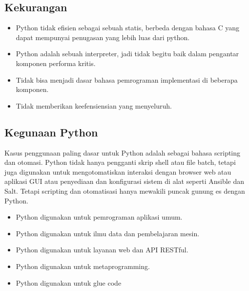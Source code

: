 	\subsection{Kekurangan}
		\begin{itemize}
			\item Python tidak efisien sebagai sebuah statis, berbeda dengan bahasa C yang dapat mempunyai penugasan yang lebih luas dari python.
			\item Python adalah sebuah interpreter, jadi tidak begitu baik dalam pengantar komponen performa kritis.
			\item Tidak bisa menjadi dasar bahasa pemrograman implementasi di beberapa komponen.
			\item Tidak memberikan keefensiensian yang menyeluruh.
		\end{itemize}
	
	\subsection{Kegunaan Python}		
	Kasus penggunaan paling dasar untuk Python adalah sebagai bahasa scripting dan otomasi. Python tidak hanya pengganti skrip shell atau file batch, 
	tetapi juga digunakan untuk mengotomatiskan interaksi dengan browser web atau aplikasi GUI atau penyediaan dan konfigurasi sistem di alat seperti 
	Ansible dan Salt. Tetapi scripting dan otomatisasi hanya mewakili puncak gunung es dengan Python.
		\begin{itemize}
			\item Python digunakan untuk pemrograman aplikasi umum.
			\item Python digunakan untuk ilmu data dan pembelajaran mesin.
			\item Python digunakan untuk layanan web dan API RESTful.
			\item Python digunakan untuk metaprogramming.
			\item Python digunakan untuk glue code
		\end{itemize}
	
